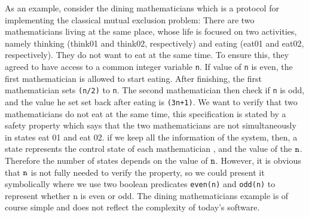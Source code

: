 

As an example, consider the dining mathematicians which is a protocol for implementing the classical mutual exclusion problem: There are two mathematicians living at the same place, whose life is focused on two activities, namely thinking (think01 and think02, respectively) and eating (eat01 and eat02, respectively). They do not want to eat at the same time. To ensure this, they agreed to have access to a common integer variable {\tt n}. If value of {\tt n} is even, the first mathematician is allowed to start eating. After finishing, the first mathematician sets {\tt (n/2)} to {\tt n}. The second mathematician then check if {\tt n} is odd, and the value he set set back after eating is {\tt (3n+1)}. 
We want to verify that two mathematicians do not eat at the same time, this specification is stated by a safety property which says that the two mathematicians are not simultaneously in states eat 01 and eat 02. 
if we keep all the information of the system, then, a state represents the control state of each mathematician
, and the value of the $\tt n$. Therefore the number of states depends on the value of $\tt n$. 
However, it is obvious that $\tt n$ is not fully needed to verify the property, so we could present it symbolically where we use two boolean predicates {\tt even(n)} and {\tt odd(n)} to represent  whether n is even or odd. The dining mathematicians example is of course simple and does not reflect the complexity of today’s software.  


